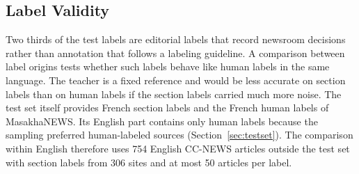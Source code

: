 \documentclass{ieeeaccess}
\begin{document}
\begin{table}[!t]
\caption{Composition of the Test Set by Source}
\label{tab:testset}
\centering
\footnotesize
\setlength{\tabcolsep}{3pt}
\par\vspace{2pt}{\footnotesize The site total is one less than the column sum because one site (jpost.com) occurs in both CC-NEWS and MN-DS.\par}
\end{table}

\subsection{Label Validity}
\label{sec:validity-design}
\label{sec:res-validity}
Two thirds of the test labels are editorial labels that record newsroom decisions rather than annotation that follows a labeling guideline. A comparison between label origins tests whether such labels behave like human labels in the same language. The teacher is a fixed reference and would be less accurate on section labels than on human labels if the section labels carried much more noise. The test set itself provides French section labels and the French human labels of MasakhaNEWS. Its English part contains only human labels because the sampling preferred human-labeled sources (Section~\ref{sec:testset}). The comparison within English therefore uses 754 English CC-NEWS articles outside the test set with section labels from 306 sites and at most 50 articles per label.
\end{document}
